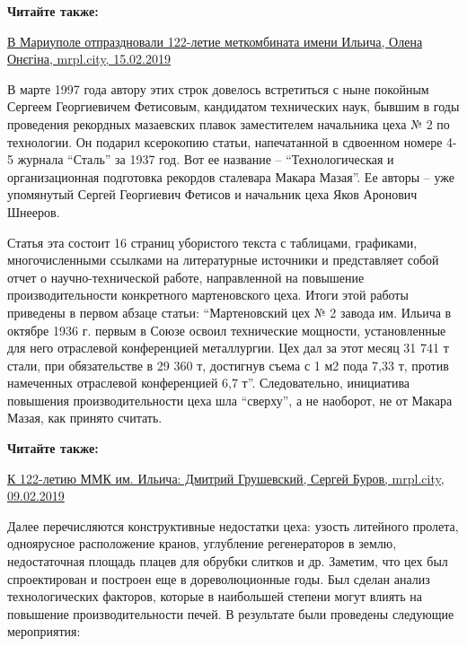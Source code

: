 \textbf{Читайте также:} 

\href{https://mrpl.city/news/view/v-mariupole-otprazdnovali-122-letie-metkombinata-imeni-ilicha-video-plusfoto}{%
В Мариуполе отпраздновали 122-летие меткомбината имени Ильича, Олена Онєгіна, mrpl.city, 15.02.2019}

В марте 1997 года автору этих строк довелось встретиться с ныне покойным
Сергеем Георгиевичем Фетисовым, кандидатом технических наук, бывшим в годы
проведения рекордных мазаевских плавок заместителем начальника цеха № 2 по
технологии. Он подарил ксерокопию статьи, напечатанной в сдвоенном номере 4-5
журнала \enquote{Сталь} за 1937 год. Вот ее название – \enquote{Технологическая и
организационная подготовка рекордов сталевара Макара Мазая}. Ее авторы – уже
упомянутый Сергей Георгиевич Фетисов и начальник цеха Яков Аронович Шнееров.


Статья эта состоит 16 страниц убористого текста с таблицами, графиками,
многочисленными ссылками на литературные источники и представляет собой отчет о
научно-технической работе, направленной на повышение производительности
конкретного мартеновского цеха. Итоги этой работы приведены в первом абзаце
статьи: \enquote{Мартеновский цех № 2 завода им. Ильича в октябре 1936 г. первым в
Союзе освоил технические мощности, установленные для него отраслевой
конференцией металлургии. Цех дал за этот месяц 31 741 т стали, при
обязательстве в 29 360 т, достигнув съема с 1 м2 пода 7,33 т, против намеченных
отраслевой конференцией 6,7 т}. Следовательно, инициатива повышения
производительности цеха шла \enquote{сверху}, а не наоборот, не от Макара Мазая, как
принято считать.

\textbf{Читайте также:} 

\href{https://archive.org/details/09_02_2019.sergij_burov.mrpl_city.k_122_letiu_mmk_im_iljicha_dmitrii_grushevskii}{%
К 122-летию ММК им. Ильича: Дмитрий Грушевский, Сергей Буров, mrpl.city, 09.02.2019}

Далее перечисляются конструктивные недостатки цеха: узость литейного пролета,
одноярусное расположение кранов, углубление регенераторов в землю,
недостаточная площадь плацев для обрубки слитков и др. Заметим, что цех был
спроектирован и построен еще в дореволюционные годы. Был сделан анализ
технологических факторов, которые в наибольшей степени могут влиять на
повышение производительности печей. В результате были проведены следующие
мероприятия:

